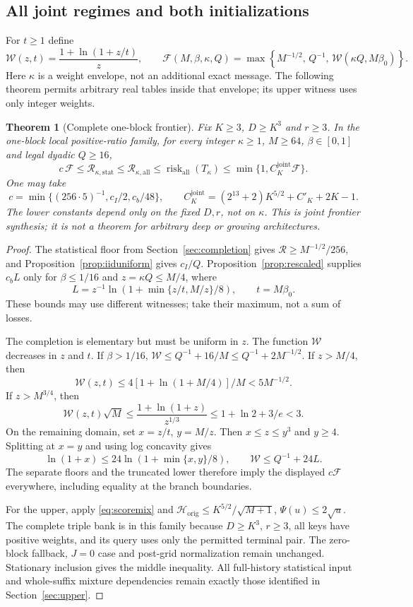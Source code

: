 \documentclass[11pt,letterpaper]{article}
\newtheorem{theorem}{Theorem}[section]
\theoremstyle{definition}\newtheorem{definition}[theorem]{Definition}
\theoremstyle{remark}\newtheorem{remark}[theorem]{Remark}
\newcommand{\betaz}{\beta_0}
\newcommand{\Risk}{\mathcal{R}}
\begin{document}
\subsection{All joint regimes and both initializations}
For $t\ge1$ define
\[
 \mathcal W(z,t)=\frac{1+\ln(1+z/t)}{z},\qquad
 \mathcal F(M,\beta,\kappa,Q)
 =\max\left\{M^{-1/2},\,Q^{-1},\,\mathcal W(\kappa Q,M\betaz)\right\}.
\]
Here $\kappa$ is a weight envelope, not an additional exact message. The following theorem permits arbitrary real tables inside that envelope; its upper witness uses only integer weights.
\begin{theorem}[Complete one-block frontier]\label{thm:joint}
Fix $K\ge3$, $D\ge K^3$ and $r\ge3$. In the one-block local positive-ratio family, for every integer $\kappa\ge1$, $M\ge64$, $\beta\in[0,1]$ and legal dyadic $Q\ge16$,
\begin{equation}\label{eq:joint}
 c\,\mathcal F\le\Risk_{\kappa,\mathrm{stat}}
 \le\Risk_{\kappa,\mathrm{all}}
 \le\operatorname{risk}_{\mathrm{all}}(T_\kappa)
 \le\min\{1,C_K^{\mathrm{joint}}\mathcal F\}.
\end{equation}
One may take
\[
 c=\min\{(256\cdot5)^{-1},c_I/2,c_b/48\},\qquad
 C_K^{\mathrm{joint}}=(2^{13}+2)K^{5/2}+C'_K+2K-1.
\]
The lower constants depend only on the fixed $D,r$, not on $\kappa$. This is joint frontier synthesis; it is not a theorem for arbitrary deep or growing architectures.
\end{theorem}
\begin{proof}
The statistical floor from Section~\ref{sec:completion} gives $\Risk\ge M^{-1/2}/256$, and Proposition~\ref{prop:iiduniform} gives $c_I/Q$. Proposition~\ref{prop:rescaled} supplies $c_bL$ only for $\beta\le1/16$ and $z=\kappa Q\le M/4$, where
\[
 L=z^{-1}\ln(1+\min\{z/t,M/z\}/8),\qquad t=M\betaz.
\]
These bounds may use different witnesses; take their maximum, not a sum of losses.

The completion is elementary but must be uniform in $z$. The function $\mathcal W$ decreases in $z$ and $t$. If $\beta>1/16$,
$\mathcal W\le Q^{-1}+16/M\le Q^{-1}+2M^{-1/2}$.
If $z>M/4$, then
\[
 \mathcal W(z,t)\le4[1+\ln(1+M/4)]/M<5M^{-1/2}.
\]
If $z>M^{3/4}$, then
\[
 \mathcal W(z,t)\sqrt M
 \le\frac{1+\ln(1+z)}{z^{1/3}}
 \le1+\ln2+3/e<3.
\]
On the remaining domain, set $x=z/t$, $y=M/z$. Then $x\le z\le y^3$ and $y\ge4$. Splitting at $x=y$ and using log concavity gives
\[
 \ln(1+x)\le24\ln(1+\min\{x,y\}/8),\qquad
 \mathcal W\le Q^{-1}+24L.
\]
The separate floors and the truncated lower therefore imply the displayed $c\mathcal F$ everywhere, including equality at the branch boundaries.

For the upper, apply \eqref{eq:scoremix} and
$\mathcal H_{\mathrm{orig}}\le K^{5/2}/\sqrt{M+1}$,
$\Psi(u)\le2\sqrt u$. The complete triple bank is in this family because $D\ge K^3$, $r\ge3$, all keys have positive weights, and its query uses only the permitted terminal pair. The zero-block fallback, $J=0$ case and post-grid normalization remain unchanged. Stationary inclusion gives the middle inequality. All full-history statistical input and whole-suffix mixture dependencies remain exactly those identified in Section~\ref{sec:upper}.
\end{proof}
\end{document}
